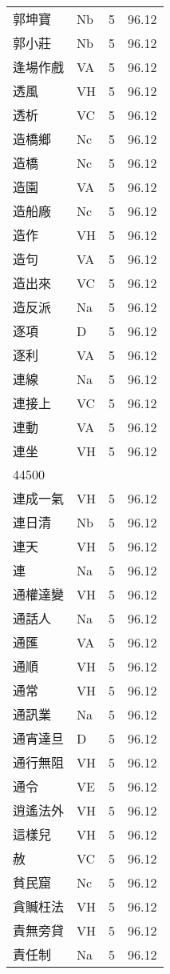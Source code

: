 \documentclass[twocolumn]{book}
\begin{document}
\begin{supertabular}{llrr}
郭坤寶 & Nb & 5 &  96.12\\
郭小莊 & Nb & 5 &  96.12\\
逢場作戲 & VA & 5 &  96.12\\
透風 & VH & 5 &  96.12\\
透析 & VC & 5 &  96.12\\
造橋鄉 & Nc & 5 &  96.12\\
造橋 & Nc & 5 &  96.12\\
造園 & VA & 5 &  96.12\\
造船廠 & Nc & 5 &  96.12\\
造作 & VH & 5 &  96.12\\
造句 & VA & 5 &  96.12\\
造出來 & VC & 5 &  96.12\\
造反派 & Na & 5 &  96.12\\
逐項 & D & 5 &  96.12\\
逐利 & VA & 5 &  96.12\\
連線 & Na & 5 &  96.12\\
連接上 & VC & 5 &  96.12\\
連動 & VA & 5 &  96.12\\
連坐 & VH & 5 &  96.12\\
44500\\
連成一氣 & VH & 5 &  96.12\\
連日清 & Nb & 5 &  96.12\\
連天 & VH & 5 &  96.12\\
連 & Na & 5 &  96.12\\
通權達變 & VH & 5 &  96.12\\
通話人 & Na & 5 &  96.12\\
通匯 & VA & 5 &  96.12\\
通順 & VH & 5 &  96.12\\
通常 & VH & 5 &  96.12\\
通訊業 & Na & 5 &  96.12\\
通宵達旦 & D & 5 &  96.12\\
通行無阻 & VH & 5 &  96.12\\
通令 & VE & 5 &  96.12\\
逍遙法外 & VH & 5 &  96.12\\
這樣兒 & VH & 5 &  96.12\\
赦 & VC & 5 &  96.12\\
貧民窟 & Nc & 5 &  96.12\\
貪贓枉法 & VH & 5 &  96.12\\
責無旁貸 & VH & 5 &  96.12\\
責任制 & Na & 5 &  96.12\\

\end{supertabular}
\end{document}
